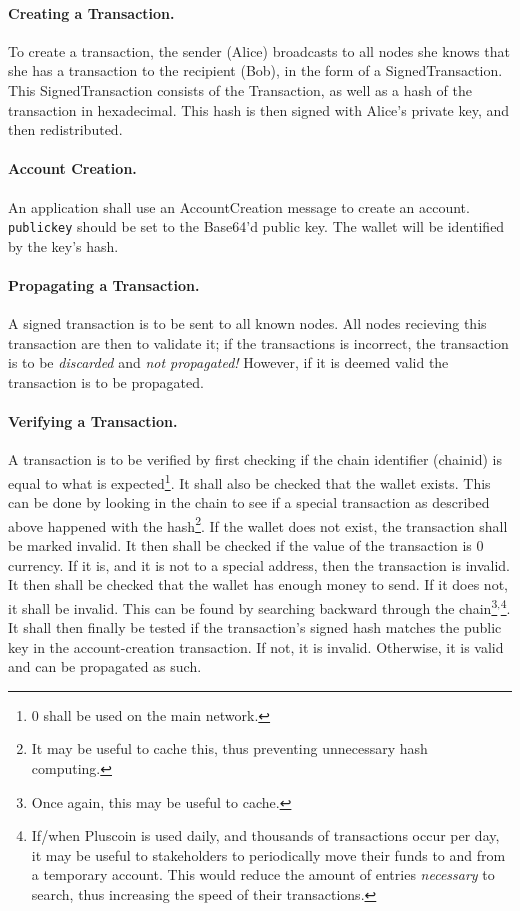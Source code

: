 \documentclass{article}
\begin{document}
\paragraph{Creating a Transaction.} To create a transaction, the sender (Alice)
broadcasts to all nodes she knows that she has a transaction to the recipient
(Bob), in the form of a SignedTransaction. This SignedTransaction consists of
the Transaction, as well as a hash of the transaction in hexadecimal. This hash is
then signed with Alice's private key, and then redistributed.

\paragraph{Account Creation.} An application shall use an AccountCreation
message to create an account. \verb|publickey| should be set to the Base64'd
public key. The wallet will be identified by the key's hash.

\label{prop}
\paragraph{Propagating a Transaction.} A signed transaction is to be sent to all
known nodes. All nodes recieving this transaction are then to validate
it; if the transactions is incorrect, the transaction is to be {\it{discarded}}
and {\it{not propagated!}} However, if it is deemed valid the transaction is to
be propagated.

\paragraph{Verifying a Transaction.} A transaction is to be verified by first
checking if the chain identifier (chainid) is equal to what is
expected\footnote{$0$ shall be used on the main network.}. It shall also be
checked that the wallet exists.
This can be done by looking in the chain to see if a special transaction
as described above happened with the hash\footnote{It may be useful to cache
this, thus preventing unnecessary hash computing.}. If the wallet does not
exist, the transaction shall be marked invalid. It then shall be checked if the
value of the transaction is 0 currency. If it is, and it is not to
a special address, then the transaction is invalid. It then shall be checked
that the wallet has enough money to send. If it does not, it shall be invalid.
This can be found by searching backward through the chain\footnote{Once
again, this may be useful to cache.}$^,$\footnote{If/when Pluscoin is used
daily, and thousands of transactions occur per day, it may be useful to
stakeholders to periodically move their funds to and from a temporary account.
This would reduce the amount of entries {\it{necessary}} to search, thus
increasing the speed of their transactions.}. It shall then finally be tested
if the transaction's signed hash matches the public key in the account-creation
transaction. If not, it is invalid. Otherwise, it is valid and can be
propagated as such.
\end{document}
